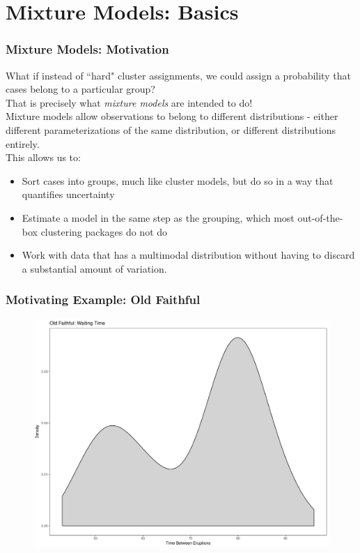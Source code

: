 \documentclass{beamer}
\begin{document}
\section{Mixture Models: Basics}

\begin{frame}
\frametitle{Mixture Models: Motivation}
	What if instead of ``hard" cluster assignments, we could assign a probability that cases belong to a particular group?\\
	That is precisely what \textit{mixture models} are intended to do!\\
	Mixture models allow observations to belong to different distributions - either different parameterizations of the same distribution, or different distributions entirely.\\
	This allows us to:
	\begin{itemize}
		\item Sort cases into groups, much like cluster models, but do so in a way that quantifies uncertainty
		\item Estimate a model in the same step as the grouping, which most out-of-the-box clustering packages do not do
		\item Work with data that has a multimodal distribution without having to discard a substantial amount of variation. 
	\end{itemize}
\end{frame}

\begin{frame}
\frametitle{Motivating Example: Old Faithful}
	\begin{figure}
		\centering
		\includegraphics[width=0.7\linewidth,]{faithfulplot}
		\caption*{}
		\label{fig:faithfulplot}
	\end{figure}
	
\end{frame}
\end{document}
